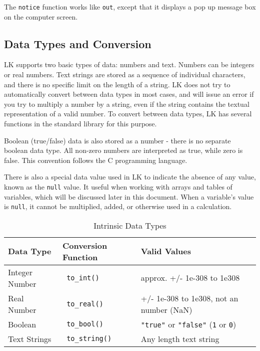 \documentclass{article}
\begin{document}
The \texttt{notice} function works like \texttt{out}, except that it displays a pop up message box on the computer screen.

\subsection{Data Types and Conversion}

LK supports two basic types of data: numbers and text.  Numbers can be integers or real numbers.  Text strings are stored as a sequence of individual characters, and there is no specific limit on the length of a string.  LK does not try to automatically convert between data types in most cases, and will issue an error if you try to multiply a number by a string, even if the string contains the textual representation of a valid number.   To convert between data types, LK has several functions in the standard library for this purpose.

Boolean (true/false) data is also stored as a number - there is no separate boolean data type.  All non-zero numbers are interpreted as true, while zero is false.  This convention follows the C programming language.

There is also a special data value used in LK to indicate the absence of any value, known as the \texttt{null} value.  It useful when working with arrays and tables of variables, which will be discussed later in this document.  When a variable's value is \texttt{null}, it cannot be multiplied, added, or otherwise used in a calculation.


\begin{table}[ht]
\begin{center}
\begin{tabular}{lll}
Data Type & Conversion Function & Valid Values \\
\hline
Integer Number & \texttt{ to\_int() } & approx. +/- 1e-308 to 1e308 \\
Real Number & \texttt{ to\_real() } & +/- 1e-308 to 1e308, not an number (NaN) \\
Boolean & \texttt{ to\_bool() } & \texttt{"true"} or \texttt{"false"} (\texttt{1} or \texttt{0}) \\
Text Strings & \texttt{ to\_string() } & Any length text string \\
\end{tabular}
\caption{Intrinsic Data Types}
\label{tab_datatypes}
\end{center}
\end{table}
\end{document}
